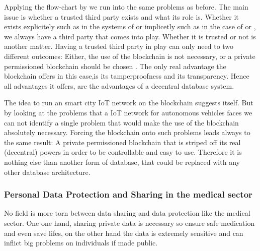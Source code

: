 Applying the flow-chart by \citeauthor{Wust2017} we run into the same problems as before. The main issue is whether a trusted third party exists and what its role is. Whether it exists explicitely such as in the systems of \cite{Sharma2017} or implicetly such as in the case of \cite{Rowan2017} or \cite{DorriSteger2017}, we always have a third party that comes into play. Whether it is trusted or not is another matter.
Having a trusted third party in play can only need to two different outcomes: Either, the use of the blockchain is not necessary, or a private permissioned blockchain should be chosen \cite{Wust2017}.
The only real advantage the blockchain offers in this case,is its tamperproofness and its transparency. Hence all advantages it offers, are the advantages of a decentral database system.

The idea to run an smart city IoT network on the blockchain suggests itself. 
But by looking at the problems that a IoT network for autonomous vehicles faces we can not identify a single problem that would make the use of the blockchain absolutely necessary. Forcing the blockchain onto such problems leads always to the same result: A private permissioned blockchain that is striped off its real (decentral) powers in order to be controllable and easy to use. Therefore it is nothing else than another form of database, that could be replaced with any other database architecture.

\subsubsection{Personal Data Protection and Sharing in the medical sector}
No field is more torn between data sharing and data protection like the medical sector. One one hand, sharing private data is necessary so ensure safe medication and even save lifes, on the other hand the data is extremely sensitive and can inflict big problems on individuals if made public. 

